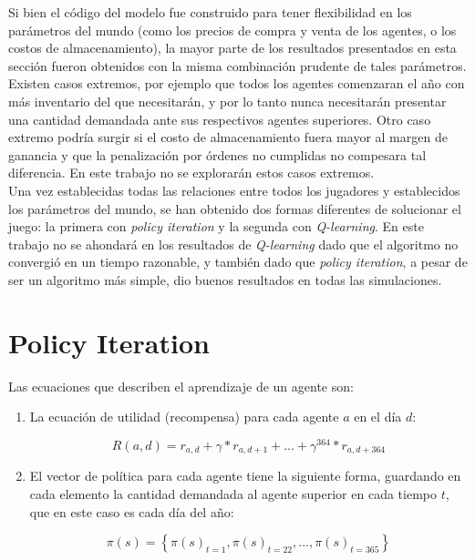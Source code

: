 Si bien el c\'odigo del modelo fue construido para tener flexibilidad en los par\'ametros del mundo (como los precios de compra y venta de los agentes, o los costos de almacenamiento), la mayor parte de los resultados presentados en esta secci\'on fueron obtenidos con la misma combinaci\'on prudente de tales par\'ametros. Existen casos extremos, por ejemplo que todos los agentes comenzaran el a\~no con m\'as inventario del que necesitar\'an, y por lo tanto nunca necesitar\'an presentar una cantidad demandada ante sus respectivos agentes superiores. Otro caso extremo podr\'ia surgir si el costo de almacenamiento fuera mayor al margen de ganancia y que la penalizaci\'on por \'ordenes no cumplidas no compesara tal diferencia. En este trabajo no se explorar\'an estos casos extremos.\\

Una vez establecidas todas las relaciones entre todos los jugadores y establecidos los par\'ametros del mundo, se han obtenido dos formas diferentes de solucionar el juego: la primera con \textit{policy iteration} y la segunda con \textit{Q-learning}. En este trabajo no se ahondar\'a en los resultados de \textit{Q-learning} dado que el algoritmo no convergi\'o en un tiempo razonable, y tambi\'en dado que \textit{policy iteration}, a pesar de ser un algoritmo m\'as simple, dio buenos resultados en todas las simulaciones.

\section{Policy Iteration}

Las ecuaciones que describen el aprendizaje de un agente son:

\begin{enumerate}
    \item La ecuaci\'on de utilidad (recompensa) para cada agente $a$ en el d\'ia $d$:

$$
R(a, d) = r_{a,d} + \gamma*r_{a, d+1} + ... + \gamma^{364}*r_{a,d+364}
$$

    \item El vector de pol\'itica para cada agente tiene la siguiente forma, guardando en cada elemento la cantidad demandada al agente superior en cada tiempo $t$, que en este caso es cada d\'ia del a\~no:
    
$$
\pi(s) = \left \{ \pi(s)_{ t = 1}, \pi(s)_{ t = 22}, ..., \pi(s)_{ t = 365} \right \}
$$

\end{enumerate}

